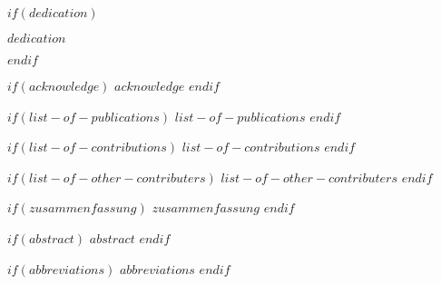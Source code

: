 \documentclass[11pt, a4paper, twosided]{book}
\begin{document}
\pagestyle{empty} %





$if(dedication)$
\vspace*{\fill}
\begin{center}
\textit{$dedication$}
\end{center}
\vspace*{\fill}
\newpage\null\thispagestyle{empty}\newpage
$endif$

\pagestyle{plain}
\setcounter{page}{1}    %
$if(acknowledge)$
\newpage
$acknowledge$
\newpage\null\newpage
$endif$


$if(list-of-publications)$
    $list-of-publications$
\newpage\null\newpage
$endif$

$if(list-of-contributions)$
    $list-of-contributions$
\newpage\null\newpage
$endif$

$if(list-of-other-contributers)$
    $list-of-other-contributers$
\newpage\null\newpage
$endif$


$if(zusammenfassung)$
    $zusammenfassung$
$endif$
\newpage\null\newpage


$if(abstract)$
    $abstract$
$endif$
\newpage\null\newpage

\newpage
\tableofcontents
\clearpage

$if(abbreviations)$
\newpage
$abbreviations$
$endif$
\end{document}
